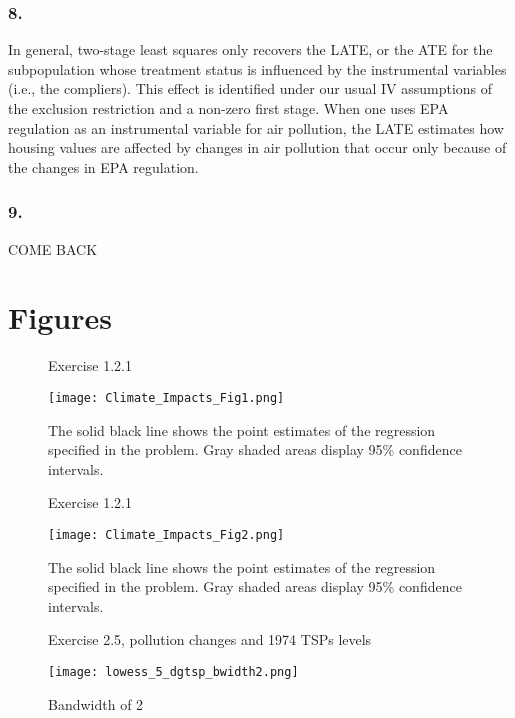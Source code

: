 \documentclass[12pt]{article}
\begin{document}
\subsubsection*{8.}
In general, two-stage least squares only recovers the LATE, or the ATE for the subpopulation whose treatment status is influenced by the instrumental variables (i.e., the compliers). This effect is identified under our usual IV assumptions of the exclusion restriction and a non-zero first stage. When one uses EPA regulation as an instrumental variable for air pollution, the LATE estimates how housing values are affected by changes in air pollution that occur only because of the changes in EPA regulation. %




\subsubsection*{9.}
COME BACK

\clearpage


\section*{Figures}

\begin{figure}[h!]
\centering
\caption{Exercise 1.2.1}
\texttt{[image: Climate\_Impacts\_Fig1.png]}
\caption*{The solid black line shows the point estimates of the regression specified in the problem. Gray shaded areas display 95\% confidence intervals.}
\label{fig_climate_impacts_1}
\end{figure}


\begin{figure}[h!]
\centering
\caption{Exercise 1.2.1}
\texttt{[image: Climate\_Impacts\_Fig2.png]}
\caption*{The solid black line shows the point estimates of the regression specified in the problem. Gray shaded areas display 95\% confidence intervals.}
\label{fig_climate_impacts_2}
\end{figure}

\clearpage

\begin{figure}[h!]
\centering
\caption{Exercise 2.5, pollution changes and 1974 TSPs levels}
\texttt{[image: lowess\_5\_dgtsp\_bwidth2.png]}
\caption*{Bandwidth of 2}
\label{fig_lowess5_pollution}
\end{figure}
\end{document}
